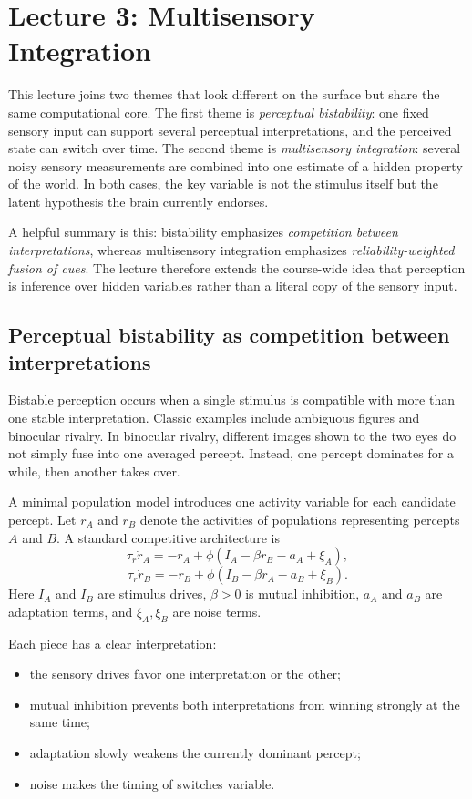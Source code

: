 \section{Lecture 3: Multisensory Integration}

This lecture joins two themes that look different on the surface but share the same computational core. The first theme is \emph{perceptual bistability}: one fixed sensory input can support several perceptual interpretations, and the perceived state can switch over time. The second theme is \emph{multisensory integration}: several noisy sensory measurements are combined into one estimate of a hidden property of the world. In both cases, the key variable is not the stimulus itself but the latent hypothesis the brain currently endorses.

A helpful summary is this: bistability emphasizes \emph{competition between interpretations}, whereas multisensory integration emphasizes \emph{reliability-weighted fusion of cues}. The lecture therefore extends the course-wide idea that perception is inference over hidden variables rather than a literal copy of the sensory input.

\subsection{Perceptual bistability as competition between interpretations}

Bistable perception occurs when a single stimulus is compatible with more than one stable interpretation. Classic examples include ambiguous figures and binocular rivalry. In binocular rivalry, different images shown to the two eyes do not simply fuse into one averaged percept. Instead, one percept dominates for a while, then another takes over.

A minimal population model introduces one activity variable for each candidate percept. Let \(r_A\) and \(r_B\) denote the activities of populations representing percepts \(A\) and \(B\). A standard competitive architecture is
\[
\tau_r \dot r_A = -r_A + \phi(I_A - \beta r_B - a_A + \xi_A),
\]
\[
\tau_r \dot r_B = -r_B + \phi(I_B - \beta r_A - a_B + \xi_B).
\]
Here \(I_A\) and \(I_B\) are stimulus drives, \(\beta>0\) is mutual inhibition, \(a_A\) and \(a_B\) are adaptation terms, and \(\xi_A,\xi_B\) are noise terms.

Each piece has a clear interpretation:
\begin{itemize}
    \item the sensory drives favor one interpretation or the other;
    \item mutual inhibition prevents both interpretations from winning strongly at the same time;
    \item adaptation slowly weakens the currently dominant percept;
    \item noise makes the timing of switches variable.
\end{itemize}

